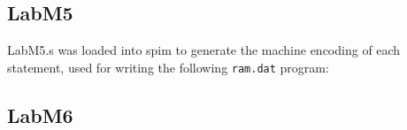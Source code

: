 \documentclass{article}
\begin{document}
\subsection{LabM5}


LabM5.s was loaded into spim to generate the machine encoding of each
statement, used for writing the following \verb$ram.dat$ program:


\subsection{LabM6}


\end{document}

